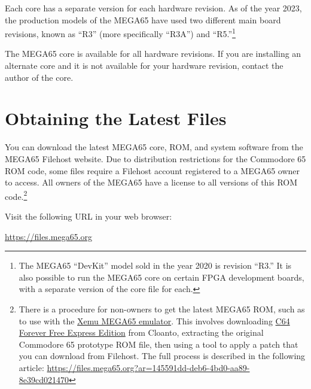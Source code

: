 Each core has a separate version for each hardware revision. As of the year 2023, the production models of the MEGA65 have used two different main board revisions, known as ``R3'' (more specifically ``R3A'') and ``R5.''\footnote{The MEGA65 ``DevKit'' model sold in the year 2020 is revision ``R3.'' It is also possible to run the MEGA65 core on certain FPGA development boards, with a separate version of the core file for each.}

The MEGA65 core is available for all hardware revisions. If you are installing an alternate core and it is not available for your hardware revision, contact the author of the core.

\section{Obtaining the Latest Files}

You can download the latest MEGA65 core, ROM, and system software from the MEGA65 Filehost website. Due to distribution restrictions for the Commodore 65 ROM code, some files require a Filehost account registered to a MEGA65 owner to access. All owners of the MEGA65 have a license to all versions of this ROM code.\footnote{There is a procedure for non-owners to get the latest MEGA65 ROM, such as to use with the \href{https://github.lgb.hu/xemu/}{Xemu MEGA65 emulator}. This involves downloading \href{https://www.c64forever.com/}{C64 Forever Free Express Edition} from Cloanto, extracting the original Commodore 65 prototype ROM file, then using a tool to apply a patch that you can download from Filehost. The full process is described in the following article: \url{https://files.mega65.org?ar=145591dd-deb6-4bd0-aa89-8e39cd021470}}

Visit the following URL in your web browser:

\url{https://files.mega65.org}

\begin{center}
\end{center}

